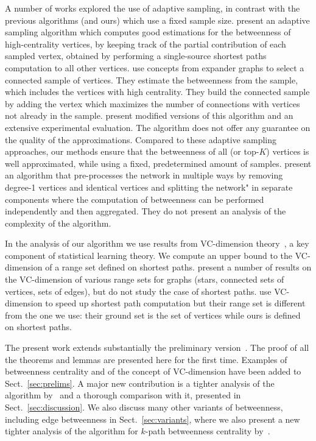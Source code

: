 A number of works explored
the use of adaptive sampling, in contrast with the previous algorithms (and
ours) which use a fixed sample size. \citet{BaderKMM07} present an adaptive
sampling algorithm which computes good estimations for the betweenness of
high-centrality vertices, by keeping track of the partial contribution of each
sampled vertex, obtained by performing a single-source shortest paths
computation to all other vertices. \citet{MaiyaBW10} use concepts from expander
graphs to select a connected sample of vertices. They estimate the betweenness
from the sample, which includes the vertices with high centrality. They build
the connected sample by adding the vertex which maximizes the number of
connections with vertices not already in the sample. \citet{LimMRTB11} present
modified versions of this algorithm and an extensive experimental evaluation.
The algorithm does not offer any guarantee on the quality of the approximations.
Compared to these adaptive sampling approaches, our methods ensure that the
betweenness of all (or top-$K$) vertices is well approximated, while using a
fixed, predetermined amount of samples.  \citet{SaryuceSKC13} present an
algorithm that pre-processes the network in multiple ways by removing degree-1
vertices and identical vertices and splitting the network" in separate
components where the computation of betweenness can be performed independently
and then aggregated. They do not present an analysis of the complexity of the
algorithm. 

In the analysis of our algorithm we use results from VC-dimension
theory~\citep{VapnikC71}, a key component of statistical learning theory. We
compute an upper bound to the VC-dimension of a range set defined on shortest
paths. \citet{KranakisKRUW97} present a number of results on the VC-dimension of
various range sets for graphs (stars, connected sets of vertices, sets of
edges), but do not study the case of shortest paths. \citet{AbrahamDFGW11} use
VC-dimension to speed up shortest path computation but their range set is
different from the one we use: their ground set is the set of vertices while
ours is defined on shortest paths.

\ifproof
The present work extends substantially the preliminary
version~\citep{RiondatoK14WSDM}. The proof of all the theorems and lemmas are
presented here for the first time. Examples of betweenness centrality and of the
concept of VC-dimension have been added to Sect.~\ref{sec:prelims}. A major new
contribution is a tighter analysis of the algorithm by~\citet{BrandesP07} and
a thorough comparison with it, presented in Sect.~\ref{sec:discussion}. We also
discuss many other variants of betweenness, including edge betweenness in
Sect.~\ref{sec:variants}, where we also present a new tighter analysis of the
algorithm for $k$-path betweenness centrality by~\citet{KourtellisASIT12}.  %
\fi

